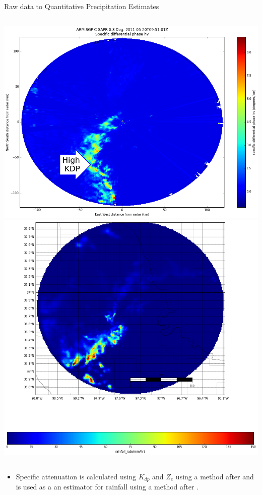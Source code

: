 \documentclass[final]{beamer}
\begin{document}
\begin{frame}{}
\begin{columns}[t]
\begin{column}{.3\linewidth}
\begin{block}{Raw data to Quantitative Precipitation Estimates}
\begin{columns}[t]
\begin{column}{.6\linewidth}
\begin{columns}[t]
\begin{column}{.5\linewidth}
           		\includegraphics[width=1.0\linewidth]{figures/kdp.png}\\[1ex]    %
			\includegraphics[width=1.0\linewidth]{figures/qpe.png}\\[1ex]  
		
		\end{column}
		\end{columns}
 		\end{column}
	\end{columns}
	\begin{itemize}
	\item Specific attenuation is calculated using {\small $K_{dp}$} and {\small $Z_e$} using a method after \citet{gu_polarimetric_2011} and is used as a an estimator for rainfall 
		using a method after \cite{ryzhkov_potential_2014}.
	\end{itemize}
      \end{block}
      

\end{column}
\end{columns}
\end{frame}
\end{document}

